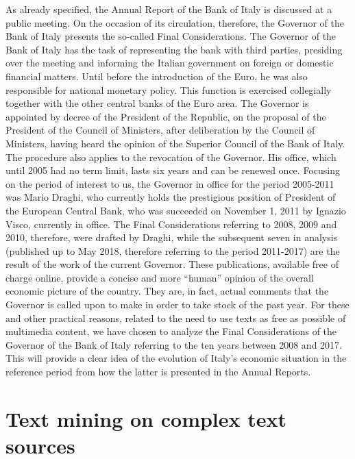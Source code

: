 \documentclass[
]{book}
\begin{document}
As already specified, the Annual Report of the Bank of Italy is discussed at a public meeting. On the occasion of its circulation, therefore, the Governor of the Bank of Italy presents the so-called Final Considerations.
The Governor of the Bank of Italy has the task of representing the bank with third parties, presiding over the meeting and informing the Italian government on foreign or domestic financial matters. Until before the introduction of the Euro, he was also responsible for national monetary policy. This function is exercised collegially together with the other central banks of the Euro area.
The Governor is appointed by decree of the President of the Republic, on the proposal of the President of the Council of Ministers, after deliberation by the Council of Ministers, having heard the opinion of the Superior Council of the Bank of Italy. The procedure also applies to the revocation of the Governor. His office, which until 2005 had no term limit, lasts six years and can be renewed once.
Focusing on the period of interest to us, the Governor in office for the period 2005-2011 was Mario Draghi, who currently holds the prestigious position of President of the European Central Bank, who was succeeded on November 1, 2011 by Ignazio Visco, currently in office.
The Final Considerations referring to 2008, 2009 and 2010, therefore, were drafted by Draghi, while the subsequent seven in analysis (published up to May 2018, therefore referring to the period 2011-2017) are the result of the work of the current Governor.
These publications, available free of charge online, provide a concise and more ``human'' opinion of the overall economic picture of the country. They are, in fact, actual comments that the Governor is called upon to make in order to take stock of the past year.
For these and other practical reasons, related to the need to use texts as free as possible of multimedia content, we have chosen to analyze the Final Considerations of the Governor of the Bank of Italy referring to the ten years between 2008 and 2017. This will provide a clear idea of the evolution of Italy's economic situation in the reference period from how the latter is presented in the Annual Reports.

\hypertarget{text-mining-on-complex-text-sources}{%
\section{Text mining on complex text sources}\label{text-mining-on-complex-text-sources}}
\end{document}
